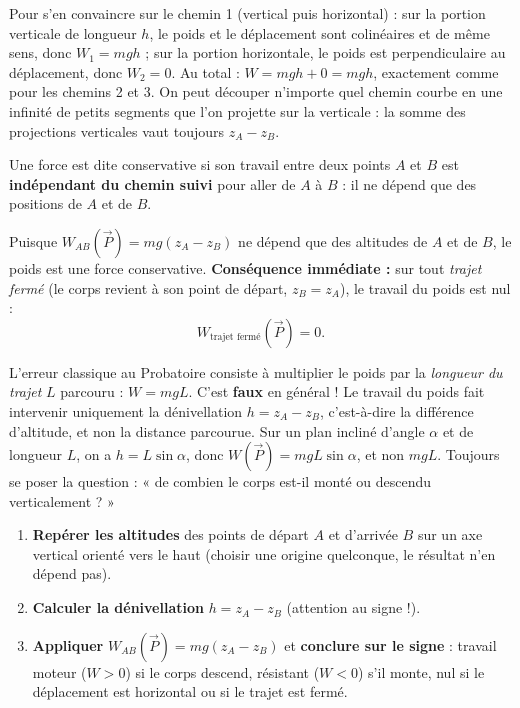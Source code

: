 \documentclass[11pt]{article}
\newcommand{\cle}[1]{{\popxbold\color{popdark}#1}}
\begin{document}
Pour s'en convaincre sur le chemin 1 (vertical puis horizontal) : sur la portion verticale de longueur $h$, le poids et le déplacement sont colinéaires et de même sens, donc $W_1 = mgh$ ; sur la portion horizontale, le poids est perpendiculaire au déplacement, donc $W_2 = 0$. Au total : $W = mgh + 0 = mgh$, exactement comme pour les chemins 2 et 3. On peut découper n'importe quel chemin courbe en une infinité de petits segments que l'on projette sur la verticale : la somme des projections verticales vaut toujours $z_A - z_B$.

\begin{definition}
Une force est dite \cle{conservative} si son travail entre deux points $A$ et $B$ est \textbf{indépendant du chemin suivi} pour aller de $A$ à $B$ : il ne dépend que des positions de $A$ et de $B$.
\end{definition}

\begin{propriete}
Puisque $W_{AB}(\vec{P}) = mg(z_A - z_B)$ ne dépend que des altitudes de $A$ et de $B$, le \cle{poids est une force conservative}.
\textbf{Conséquence immédiate :} sur tout \emph{trajet fermé} (le corps revient à son point de départ, $z_B = z_A$), le travail du poids est nul :
\[ W_{\text{trajet fermé}}(\vec{P}) = 0. \]
\end{propriete}

\begin{attention}
L'erreur classique au Probatoire consiste à multiplier le poids par la \emph{longueur du trajet} $L$ parcouru : $W = mgL$. C'est \textbf{faux} en général ! Le travail du poids fait intervenir uniquement la \cle{dénivellation} $h = z_A - z_B$, c'est-à-dire la différence d'altitude, et non la distance parcourue. Sur un plan incliné d'angle $\alpha$ et de longueur $L$, on a $h = L\sin\alpha$, donc $W(\vec{P}) = mgL\sin\alpha$, et non $mgL$. Toujours se poser la question : « de combien le corps est-il monté ou descendu verticalement ? »
\end{attention}

\begin{methode}
\begin{enumerate}
\item \textbf{Repérer les altitudes} des points de départ $A$ et d'arrivée $B$ sur un axe vertical orienté vers le haut (choisir une origine quelconque, le résultat n'en dépend pas).
\item \textbf{Calculer la dénivellation} $h = z_A - z_B$ (attention au signe !).
\item \textbf{Appliquer} $W_{AB}(\vec{P}) = mg(z_A - z_B)$ et \textbf{conclure sur le signe} : travail moteur ($W>0$) si le corps descend, résistant ($W<0$) s'il monte, nul si le déplacement est horizontal ou si le trajet est fermé.
\end{enumerate}
\end{methode}
\end{document}
